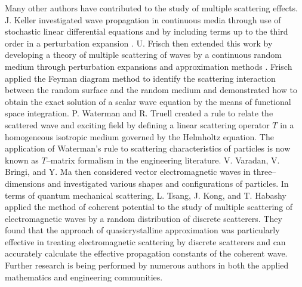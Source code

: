 Many other authors have contributed to the study of multiple scattering effects. J. Keller investigated wave propagation in continuous media through use of stochastic linear differential equations \cite{keller1964stochastic} and by including terms up to the third order in a perturbation expansion \cite{de1998stochastic}. U. Frisch then extended this work by developing a theory of multiple scattering of waves by a continuous random medium through perturbation expansions and approximation methods \cite{frisch1965wave}. Frisch applied the Feyman diagram method to identify the scattering interaction between the random surface and the random medium and demonstrated how to obtain the exact solution of a scalar wave equation by the means of functional space integration. P. Waterman and R. Truell created a rule \cite{waterman1961multiple} to relate the scattered wave and exciting field by defining a linear scattering operator $T$ in a homogeneous isotropic medium governed by the Helmholtz equation. The application of Waterman's rule to scattering characteristics of particles is now known as $T$--matrix formalism in the engineering literature. V. Varadan, V. Bringi, and Y. Ma \cite{varadan1979coherent,varadan1984coherent} then considered vector electromagnetic waves in three--dimensions and investigated various shapes and configurations of particles. In terms of quantum mechanical scattering, L. Tsang, J. Kong, and T. Habashy applied the method of coherent
potential  \cite{tsang1980multiple,tsang1982multiple} to the study of multiple scattering of electromagnetic waves by a random distribution of discrete scatterers. They found that the approach of quasicrystalline approximation was particularly effective in treating electromagnetic scattering by discrete scatterers and can accurately calculate the effective propagation constants of the coherent
wave. Further research is being performed by numerous authors in both the applied mathematics and engineering communities.